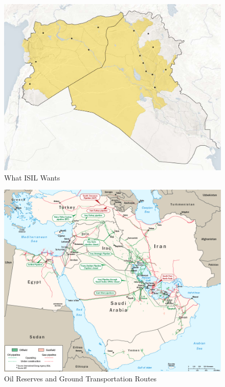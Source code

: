 \documentclass{report}
\begin{document}
\begin{figure}[H]
 \centering
 \includegraphics[trim = 0cm 0cm 0cm 0cm, clip,scale=0.3]{./figures/current2.png}
   \caption{What ISIL Wants \cite{Lewis2014}}
     \label{fig:current2}
\end{figure}



\begin{figure}[H]
 \centering
 \includegraphics[trim = 0cm 0cm 0cm 0cm, clip,scale=0.3]{./figures/oil_reserves.png}
   \caption{Oil Reserves and Ground Transportation Routes \cite{PoliticalCalculations2012}}
     \label{fig:oil_reserves}
\end{figure}
\end{document}
